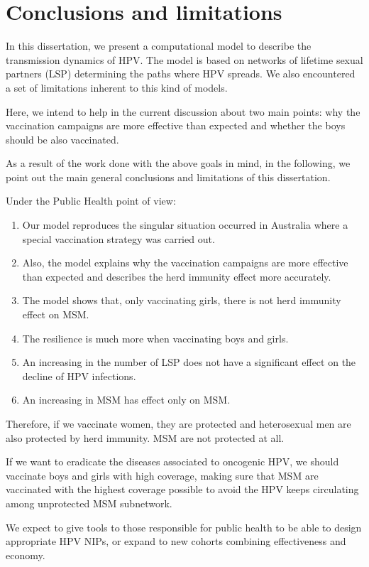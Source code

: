 \chapter{Conclusions and limitations}\label{conclusion}
In this dissertation, we present a computational model to describe the transmission dynamics of HPV. The model is based on networks of lifetime sexual partners (LSP) determining the paths where HPV spreads. We also encountered a set of limitations inherent to this kind of models.

Here, we intend to help in the current discussion about two main points: why the vaccination campaigns are more effective than expected and whether the boys should be also vaccinated.

As a result of the work done with the above goals in mind, in the following, we point out the main general conclusions and limitations of this dissertation.

Under the Public Health point of view:
\begin{enumerate}
	\item Our model reproduces the singular situation occurred in Australia where a special vaccination strategy was carried out.
	\item Also, the model explains why the vaccination campaigns are more effective than expected and describes the herd immunity effect more accurately.
	\item The model shows that, only vaccinating girls, there is not herd immunity effect on MSM.
	\item The resilience is much more when vaccinating boys and girls. 
	\item An increasing in the number of LSP does not have a significant effect on the decline of HPV infections.
	\item An increasing in MSM has effect only on MSM.
\end{enumerate}

Therefore, if we vaccinate women, they are protected and heterosexual men are also protected by herd immunity. MSM are not protected at all.

If we want to eradicate the diseases associated to oncogenic HPV, we should vaccinate boys and girls with high coverage, making sure that MSM are vaccinated with the highest coverage possible to avoid the HPV keeps circulating among unprotected MSM subnetwork.

We expect to give tools to those responsible for public health to be able to design appropriate HPV NIPs, or expand to new cohorts combining effectiveness and economy.


